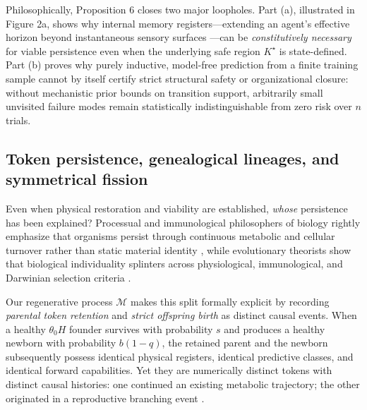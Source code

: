 \documentclass[11pt,a4paper]{article}
\begin{document}
Philosophically, Proposition 6 closes two major loopholes. Part (a),
illustrated in Figure 2a, shows why internal memory
registers---extending an agent's effective horizon beyond instantaneous
sensory surfaces
\citep{sethTsakiris2018, kaelbling1998, papadimitriouTsitsiklis1987}---can
be \emph{constitutively necessary} for viable persistence even when the
underlying safe region \(K^\star\) is state-defined. Part (b) proves why
purely inductive, model-free prediction from a finite training sample
cannot by itself certify strict structural safety or organizational
closure: without mechanistic prior bounds on transition support,
arbitrarily small unvisited failure modes remain statistically
indistinguishable from zero risk over \(n\) trials.

\subsection{Token persistence, genealogical lineages, and symmetrical
fission}\label{token-persistence-genealogical-lineages-and-symmetrical-fission}

Even when physical restoration and viability are established,
\emph{whose} persistence has been explained? Processual and
immunological philosophers of biology rightly emphasize that organisms
persist through continuous metabolic and cellular turnover rather than
static material identity
\citep{whitehead1929, pradeu2012, dupreNicholson2018}, while
evolutionary theorists show that biological individuality splinters
across physiological, immunological, and Darwinian selection criteria
\citep{clarke2010, godfreySmith2009, maynardSmithSzathmary1995}.

Our regenerative process \(\mathcal{M}\) makes this split formally
explicit by recording \emph{parental token retention} and \emph{strict
offspring birth} as distinct causal events. When a healthy
\(\theta_0 H\) founder survives with probability \(s\) and produces a
healthy newborn with probability \(b(1-q)\), the retained parent and the
newborn subsequently possess identical physical registers, identical
predictive classes, and identical forward capabilities. Yet they are
numerically distinct tokens with distinct causal histories: one
continued an existing metabolic trajectory; the other originated in a
reproductive branching event \citep{wiggins2001}.
\end{document}
